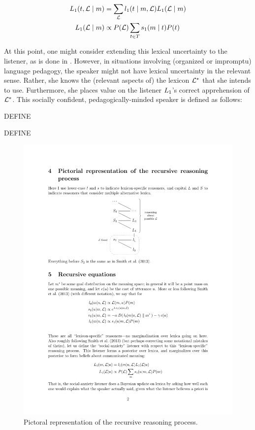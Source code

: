 \begin{definition}[$\ListenerOne$]\label{def:l1}
  \begin{align*}
  L_{1}(t, \mathcal{L} \mid m) 
  &= 
  \sum_{\mathcal{L}} l_{1}(t \mid m, \mathcal{L}) L_{1}(\mathcal{L} \mid m) 
  \\
  L_{1}(\mathcal{L} \mid m) &\propto P(\mathcal{L}) \sum_{t\in T} s_{1}(m \mid t)P(t)
  \end{align*}
\end{definition}

At this point, one might consider extending this lexical uncertainty
to the listener, as is done in \cite{Smith:Goodman:Frank:2013}.
However, in situations involving (organized or impromptu) language
pedagogy, the speaker might not have lexical uncertainty in the
relevant sense.  Rather, she knows the (relevant aspects of) the
lexicon $\mathcal{L}^{\ast}$ that she intends to use. Furthermore, she places
value on the listener $\ListenerOne$'s correct apprehension of
$\mathcal{L}^{\ast}$. This socially confident, pedagogically-minded speaker is
defined as follows:

\begin{definition}[$\SpeakerK$]\label{def:s1}  
 DEFINE
\end{definition}

\begin{definition}[$\ListenerOne$]\label{def:l1}
  DEFINE
\end{definition}

\begin{figure}[htp]
  \centering
  \includegraphics[scale=1]{images/model}
  \caption{Pictoral representation of the recursive reasoning process.}
  \label{fig:model}
\end{figure}



